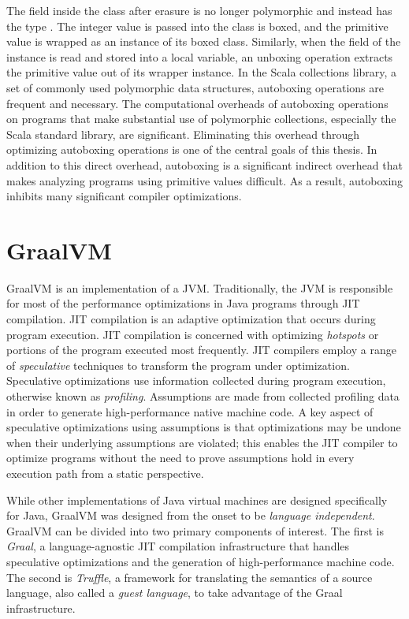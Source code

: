 The  field inside the  class after erasure is no longer polymorphic and instead has the type . 
The integer value  is passed into the  class is boxed, and the primitive value is wrapped as an instance of its boxed class.
Similarly, when the  field of the instance is read and stored into a local variable, an unboxing operation extracts the primitive value out of its wrapper instance.
In the Scala collections library, a set of commonly used polymorphic data structures, autoboxing operations are frequent and necessary.
The computational overheads of autoboxing operations on programs that make substantial use of polymorphic collections, especially the Scala standard library, are significant\cite{scala:collections-optimization}.
Eliminating this overhead through optimizing autoboxing operations is one of the central goals of this thesis.
In addition to this direct overhead, autoboxing is a significant indirect overhead that makes analyzing programs using primitive values difficult. As a result, autoboxing inhibits many significant compiler optimizations.

\section{GraalVM}

GraalVM\cite{java:graalvm} is an implementation of a JVM.
Traditionally, the JVM is responsible for most of the performance optimizations in Java programs\cite{java:hotspot} through JIT compilation.
JIT compilation is an adaptive optimization that occurs during program execution.
JIT compilation is concerned with optimizing \textit{hotspots} or portions of the program executed most frequently.
JIT compilers\cite{java:sablevm,java:jikesrvm} employ a range of \textit{speculative} techniques to transform the program under optimization.
Speculative optimizations use information collected during program execution, otherwise known as \textit{profiling}. 
Assumptions are made from collected profiling data in order to generate high-performance native machine code.
A key aspect of speculative optimizations using assumptions is that optimizations may be undone when their underlying assumptions are violated; this enables the JIT compiler to optimize programs without the need to prove assumptions hold in every execution path from a static perspective.

While other implementations of Java virtual machines are designed specifically for Java, GraalVM was designed from the onset to be \textit{language independent}.
GraalVM can be divided into two primary components of interest. 
The first is \textit{Graal}, a language-agnostic JIT compilation infrastructure that handles speculative optimizations and the generation of high-performance machine code.
The second is \textit{Truffle}, a framework for translating the semantics of a source language, also called a \textit{guest language}, to take advantage of the Graal infrastructure.

